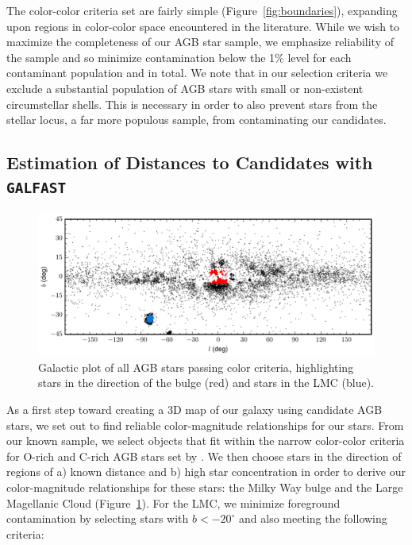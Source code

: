 The color-color criteria set are fairly simple (Figure~\ref{fig:boundaries}), expanding upon regions in color-color space encountered in the literature. While we wish to maximize the completeness of our AGB star sample, we emphasize reliability of the sample and so minimize contamination below the 1\% level for each contaminant population and in total. We note that in our selection criteria we exclude a substantial population of AGB stars with small or non-existent circumstellar shells. This is necessary in order to also prevent stars from the stellar locus, a far more populous sample, from contaminating our candidates.

\subsection{Estimation of Distances to Candidates with {\tt GALFAST}}
\begin{figure}[h]
\includegraphics[width=6in]{figs/bulge_lmc_galcoords.pdf}
\caption{Galactic plot of all AGB stars passing color criteria, highlighting stars in the direction of the bulge (red) and stars in the LMC (blue).}
\label{fig:galplot}
\end{figure}

As a first step toward creating a 3D map of our galaxy using candidate AGB stars, we set out to find reliable color-magnitude relationships for our stars. From our known sample, we select objects that fit within the narrow color-color criteria for O-rich and C-rich AGB stars set by \cite{2014MNRAS.442.3361N}. We then choose stars in the direction of regions of a) known distance and b) high star concentration in order to derive our color-magnitude relationships for these stars: the Milky Way bulge and the Large Magellanic Cloud (Figure~\ref{fig:galplot}). For the LMC, we minimize foreground contamination by selecting stars with $b < -20^\circ$ and also meeting the following criteria:

